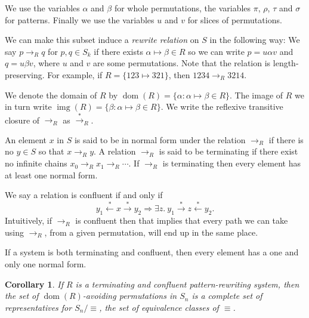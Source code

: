 \documentclass[openany, a4paper, 11pt, english]{article}
\newcommand{\breath}{\vspace{6pt plus 2pt minus 1pt}\noindent}
\newcommand{\patternrule}{ \mapsto \!}
\newtheorem{corollary}[theorem]{Corollary}
\theoremstyle{definition}
\newcommand{\Sym}{S}
\newcommand{\from}{\leftarrow}
\newcommand{\tostar}{\stackrel{*}{\to}}
\newcommand{\fromstar}{\stackrel{*}{\from}}
\DeclareMathOperator{\dom}{dom}
\DeclareMathOperator{\img}{img}
\begin{document}
We use the variables $\alpha$ and $\beta$ for whole permutations, 
the variables $\pi$, $\rho$, $\tau$ and $\sigma$ for patterns.
Finally we use the variables $u$ and $v$ for slices of permutations.

We can make this subset induce a \emph{rewrite relation} on $\Sym$ in the following way: We say
$p \to_R q$ for $p, q \in \Sym_k$ if there exists $\alpha \patternrule \beta \in R$ so
we can write $p = u \alpha v$ and $q = u \beta v$, where
$u$ and $v$ are some permutations.  Note that the relation is
length-preserving. For example, if $R = \{123 \patternrule 321\}$, then $1234 \to_R 3214$. 

\breath We denote the domain of $R$ by $\dom(R) = \{\alpha : \alpha \patternrule
\beta \in R\}$. The image of $R$ we in turn write $\img(R) = \{\beta : \alpha
\patternrule \beta \in R\}$. We write the reflexive transitive closure of
$\to_R$ as $\tostar_R$. 

An element $x$ in $\Sym$ is said to be in normal form under the relation $\to_R$
if there is no $y \in \Sym$ so that $x \to_R y$. A relation $\to_R$ is said to be
terminating if there exist no infinite chains $x_0 \to_R x_1 \to_R \cdots$. If
$\to_R$ is terminating then every element has at least one normal form. 

We say a relation is confluent if and only if
$$
    y_1 \fromstar x \tostar y_2 \Longrightarrow 
    \exists z. \  y_1 \tostar z \fromstar y_2.
$$
Intuitively, if $\to_R$ is confluent then that implies that every path we can
take using $\to_R$, from a given permutation, will end up in the same place. 

If a system is both terminating and confluent, then every element has a one and
only one normal form.

\begin{corollary}
    If $R$ is a terminating and confluent pattern-rewriting system, then the set
    of $\dom(R)$-avoiding permutations in $S_n$ is a complete set of
    representatives for $S_n / \equiv$, the set of equivalence classes of
    $\equiv$.
\end{corollary}
\end{document}
